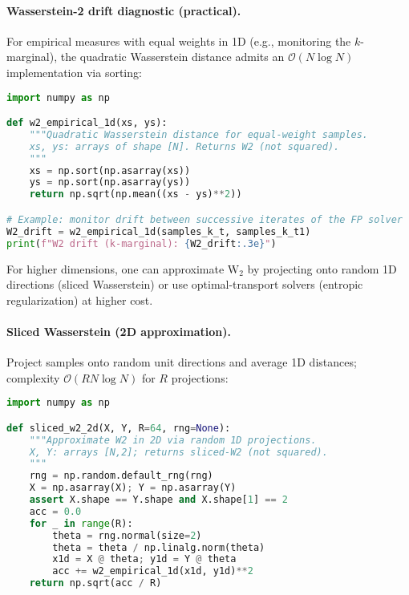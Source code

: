﻿\documentclass[11pt,letterpaper,oneside]{article}
\numberwithin{equation}{section}
\newcommand{\1}{\mathbf{1}}
\begin{document}
\begin{tcolorbox}[didacticstyle]
\begin{itemize}[leftmargin=1.1em,itemsep=0.25em]
\paragraph{Wasserstein-2 drift diagnostic (practical).}
For empirical measures with equal weights in 1D (e.g., monitoring the $k$-marginal), the quadratic Wasserstein distance admits an $\mathcal O(N\log N)$ implementation via sorting:

\begin{lstlisting}[language=Python,caption={Empirical $\mathrm W_2$ in 1D via sorting (equal weights)}]
import numpy as np

def w2_empirical_1d(xs, ys):
    """Quadratic Wasserstein distance for equal-weight samples.
    xs, ys: arrays of shape [N]. Returns W2 (not squared).
    """
    xs = np.sort(np.asarray(xs))
    ys = np.sort(np.asarray(ys))
    return np.sqrt(np.mean((xs - ys)**2))

# Example: monitor drift between successive iterates of the FP solver
W2_drift = w2_empirical_1d(samples_k_t, samples_k_t1)
print(f"W2 drift (k-marginal): {W2_drift:.3e}")
\end{lstlisting}

For higher dimensions, one can approximate $\mathrm W_2$ by projecting onto random 1D directions (sliced Wasserstein) or use optimal-transport solvers (entropic regularization) at higher cost.

\paragraph{Sliced Wasserstein (2D approximation).}
Project samples onto random unit directions and average 1D distances; complexity $\mathcal O(R N\log N)$ for $R$ projections:

\begin{lstlisting}[language=Python,caption={Sliced $\mathrm W_2$ for 2D (equal weights)}]
import numpy as np

def sliced_w2_2d(X, Y, R=64, rng=None):
    """Approximate W2 in 2D via random 1D projections.
    X, Y: arrays [N,2]; returns sliced-W2 (not squared).
    """
    rng = np.random.default_rng(rng)
    X = np.asarray(X); Y = np.asarray(Y)
    assert X.shape == Y.shape and X.shape[1] == 2
    acc = 0.0
    for _ in range(R):
        theta = rng.normal(size=2)
        theta = theta / np.linalg.norm(theta)
        x1d = X @ theta; y1d = Y @ theta
        acc += w2_empirical_1d(x1d, y1d)**2
    return np.sqrt(acc / R)
\end{lstlisting}


\end{itemize}
\end{tcolorbox}
\end{document}
